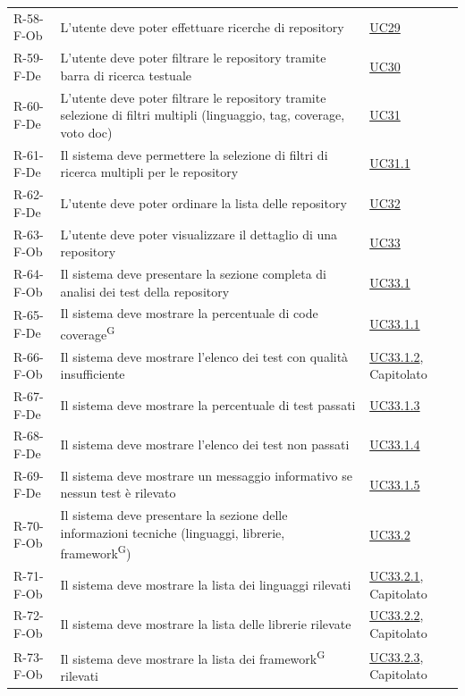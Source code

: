 \documentclass[a4paper, 11pt]{article}
\begin{document}
\begin{longtable}[c]{ >{\centering\arraybackslash}m{2.5cm} >{\centering\arraybackslash}m{8.3cm} >{\centering\arraybackslash}m{3.5cm} }
    R-58-F-Ob & L'utente deve poter effettuare ricerche di repository & \hyperref[UC29]{UC29} \\
    R-59-F-De & L'utente deve poter filtrare le repository tramite barra di ricerca testuale & \hyperref[UC30]{UC30} \\
    R-60-F-De & L'utente deve poter filtrare le repository tramite selezione di filtri multipli (linguaggio, tag, coverage, voto doc) & \hyperref[UC31]{UC31} \\
    R-61-F-De & Il sistema deve permettere la selezione di filtri di ricerca multipli per le repository & \hyperref[UC31.1]{UC31.1} \\
    R-62-F-De & L'utente deve poter ordinare la lista delle repository & \hyperref[UC32]{UC32} \\
    R-63-F-Ob & L'utente deve poter visualizzare il dettaglio di una repository & \hyperref[UC33]{UC33} \\
    R-64-F-Ob & Il sistema deve presentare la sezione completa di analisi dei test della repository & \hyperref[UC33.1]{UC33.1} \\
    R-65-F-De & Il sistema deve mostrare la percentuale di code coverage\textsuperscript{G} & \hyperref[UC33.1.1]{UC33.1.1} \\
    R-66-F-Ob & Il sistema deve mostrare l'elenco dei test con qualità insufficiente & \hyperref[UC33.1.2]{UC33.1.2}, Capitolato \\
    R-67-F-De & Il sistema deve mostrare la percentuale di test passati & \hyperref[UC33.1.3]{UC33.1.3} \\
    R-68-F-De & Il sistema deve mostrare l'elenco dei test non passati & \hyperref[UC33.1.4]{UC33.1.4} \\
    R-69-F-De & Il sistema deve mostrare un messaggio informativo se nessun test è rilevato & \hyperref[UC33.1.5]{UC33.1.5} \\
    R-70-F-Ob & Il sistema deve presentare la sezione delle informazioni tecniche (linguaggi, librerie, framework\textsuperscript{G}) & \hyperref[UC33.2]{UC33.2} \\
    R-71-F-Ob & Il sistema deve mostrare la lista dei linguaggi rilevati & \hyperref[UC33.2.1]{UC33.2.1}, Capitolato \\
    R-72-F-Ob & Il sistema deve mostrare la lista delle librerie rilevate & \hyperref[UC33.2.2]{UC33.2.2}, Capitolato \\
    R-73-F-Ob & Il sistema deve mostrare la lista dei framework\textsuperscript{G} rilevati & \hyperref[UC33.2.3]{UC33.2.3}, Capitolato \\

\end{longtable}
\end{document}
